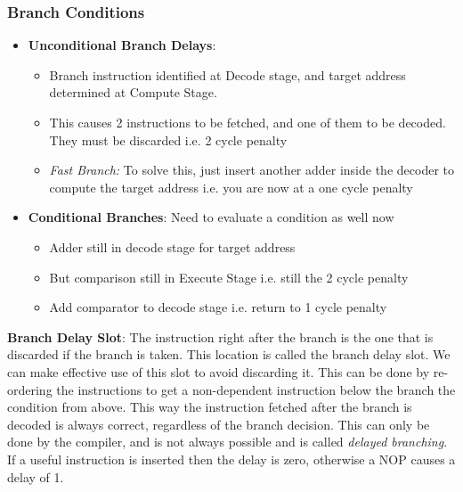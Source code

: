 \documentclass[10pt]{article}
\begin{document}
\subsubsection{Branch Conditions}
\begin{itemize}
    \item \textbf{Unconditional Branch Delays}:
    \begin{itemize}
        \item Branch instruction identified at Decode stage, and target address determined at Compute Stage.
        \item This causes 2 instructions to be fetched, and one of them to be decoded. They must be discarded i.e. 2 cycle penalty
        \item \textit{Fast Branch:} To solve this, just insert another adder inside the decoder to compute the target address i.e. you are now at a one cycle penalty
    \end{itemize}
    \item \textbf{Conditional Branches}: Need to evaluate a condition as well now
    \begin{itemize}
        \item Adder still in decode stage for target address
        \item But comparison still in Execute Stage i.e. still the 2 cycle penalty
        \item Add comparator to decode stage i.e. return to 1 cycle penalty
    \end{itemize}
\end{itemize}
\textbf{Branch Delay Slot}: The instruction right after the branch is the one that is discarded if the branch is taken. This location is called the branch delay slot. We can make effective use of this slot to avoid discarding it. This can be done by re-ordering the instructions to get a non-dependent instruction below the branch the condition from above. This way the instruction fetched after the branch is decoded is always correct, regardless of the branch decision. This can only be done by the compiler, and is not always possible and is called \textit{delayed branching}. If a useful instruction is inserted then the delay is zero, otherwise a NOP causes a delay of 1.\\
\end{document}
